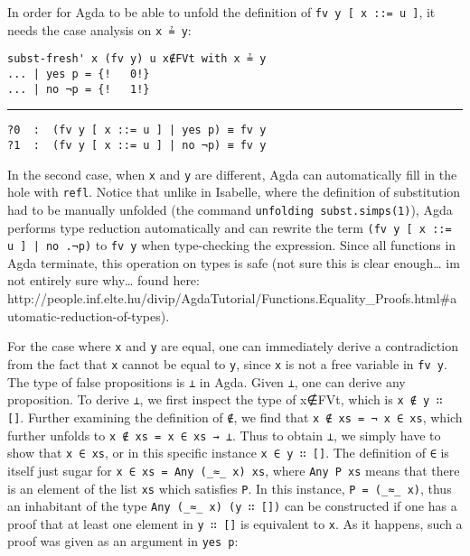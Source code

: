 \documentclass[a4paper, 12pt, twoside]{style/ociamthesis}
\theoremstyle{plain}
\theoremstyle{definition}
\theoremstyle{remark}
\begin{document}
In order for Agda to be able to unfold the definition of
\texttt{fv y [ x ::= u ]}, it needs the case analysis on \texttt{x ≟ y}:

\begin{verbatim}
subst-fresh' x (fv y) u x∉FVt with x ≟ y
... | yes p = {!   0!}
... | no ¬p = {!   1!}
\end{verbatim}

\noindent\rule{8cm}{0.4pt}

\begin{verbatim}
?0  :  (fv y [ x ::= u ] | yes p) ≡ fv y
?1  :  (fv y [ x ::= u ] | no ¬p) ≡ fv y
\end{verbatim}

In the second case, when \texttt{x} and \texttt{y} are different, Agda
can automatically fill in the hole with \texttt{refl}. Notice that
unlike in Isabelle, where the definition of substitution had to be
manually unfolded (the command \texttt{unfolding subst.simps(1)}), Agda
performs type reduction automatically and can rewrite the term
\texttt{(fv y [ x ::= u ] | no .¬p)} to \texttt{fv y} when type-checking
the expression. Since all functions in Agda terminate, this operation on
types is safe (not sure this is clear enough\ldots{} im not entirely
sure why\ldots{} found here:
http://people.inf.elte.hu/divip/AgdaTutorial/Functions.Equality\_Proofs.html\#automatic-reduction-of-types).

For the case where \texttt{x} and \texttt{y} are equal, one can
immediately derive a contradiction from the fact that \texttt{x} cannot
be equal to \texttt{y}, since \texttt{x} is not a free variable in
\texttt{fv y}. The type of false propositions is \texttt{⊥} in Agda.
Given \texttt{⊥}, one can derive any proposition. To derive \texttt{⊥},
we first inspect the type of x∉FVt, which is \texttt{x ∉ y ∷ []}.
Further examining the definition of \texttt{∉}, we find that
\texttt{x ∉ xs = ¬ x ∈ xs}, which further unfolds to
\texttt{x ∉ xs = x ∈ xs → ⊥}. Thus to obtain \texttt{⊥}, we simply have
to show that \texttt{x ∈ xs}, or in this specific instance
\texttt{x ∈ y ∷ []}. The definition of \texttt{∈} is itself just sugar
for \texttt{x ∈ xs = Any (\_≈\_ x) xs}, where \texttt{Any P xs} means
that there is an element of the list \texttt{xs} which satisfies
\texttt{P}. In this instance, \texttt{P = (\_≈\_ x)}, thus an inhabitant
of the type \texttt{Any (\_≈\_ x) (y ∷ [])} can be constructed if one
has a proof that at least one element in \texttt{y ∷ []} is equivalent
to \texttt{x}. As it happens, such a proof was given as an argument in
\texttt{yes p}:
\end{document}
